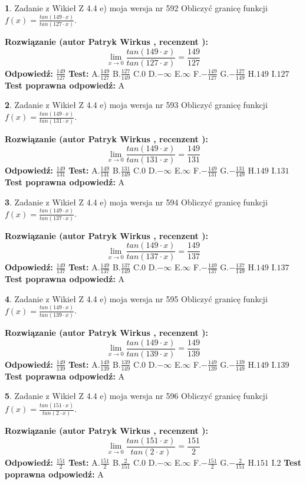 \documentclass[12pt, a4paper]{article}
\theoremstyle{definition} %
\newtheorem{zad}{}
\newcommand{\zadStart}[1]{\begin{zad}#1\newline}
\newcommand{\zadStop}{\end{zad}}
\newcommand{\rozwStart}[2]{\noindent \textbf{Rozwiązanie (autor #1 , recenzent #2): }\newline}
\newcommand{\rozwStop}{\newline}
\newcommand{\odpStart}{\noindent \textbf{Odpowiedź:}\newline}
\newcommand{\odpStop}{\newline}
\newcommand{\testStart}{\noindent \textbf{Test:}\newline}
\newcommand{\testStop}{\newline}
\newcommand{\kluczStart}{\noindent \textbf{Test poprawna odpowiedź:}\newline}
\newcommand{\kluczStop}{\newline}
\begin{document}
\zadStart{Zadanie z Wikieł Z 4.4 e) moja wersja nr 592}
Obliczyć granicę funkcji $f(x)=\frac{tan(149\cdot x)}{tan(127\cdot x)}$.
\zadStop
\rozwStart{Patryk Wirkus}{}
$$\lim\limits_{x\to 0}\frac{tan(149\cdot x)}{tan(127\cdot x)}=
\frac{149}{127}$$
\rozwStop
\odpStart
$\frac{149}{127}$
\odpStop
\testStart
A.$\frac{149}{127}$
B.$\frac{127}{149}$
C.$0$
D.$-\infty$
E.$\infty$
F.$-\frac{149}{127}$
G.$-\frac{127}{149}$
H.$149$
I.$127$
\testStop
\kluczStart
A
\kluczStop



\zadStart{Zadanie z Wikieł Z 4.4 e) moja wersja nr 593}
Obliczyć granicę funkcji $f(x)=\frac{tan(149\cdot x)}{tan(131\cdot x)}$.
\zadStop
\rozwStart{Patryk Wirkus}{}
$$\lim\limits_{x\to 0}\frac{tan(149\cdot x)}{tan(131\cdot x)}=
\frac{149}{131}$$
\rozwStop
\odpStart
$\frac{149}{131}$
\odpStop
\testStart
A.$\frac{149}{131}$
B.$\frac{131}{149}$
C.$0$
D.$-\infty$
E.$\infty$
F.$-\frac{149}{131}$
G.$-\frac{131}{149}$
H.$149$
I.$131$
\testStop
\kluczStart
A
\kluczStop



\zadStart{Zadanie z Wikieł Z 4.4 e) moja wersja nr 594}
Obliczyć granicę funkcji $f(x)=\frac{tan(149\cdot x)}{tan(137\cdot x)}$.
\zadStop
\rozwStart{Patryk Wirkus}{}
$$\lim\limits_{x\to 0}\frac{tan(149\cdot x)}{tan(137\cdot x)}=
\frac{149}{137}$$
\rozwStop
\odpStart
$\frac{149}{137}$
\odpStop
\testStart
A.$\frac{149}{137}$
B.$\frac{137}{149}$
C.$0$
D.$-\infty$
E.$\infty$
F.$-\frac{149}{137}$
G.$-\frac{137}{149}$
H.$149$
I.$137$
\testStop
\kluczStart
A
\kluczStop



\zadStart{Zadanie z Wikieł Z 4.4 e) moja wersja nr 595}
Obliczyć granicę funkcji $f(x)=\frac{tan(149\cdot x)}{tan(139\cdot x)}$.
\zadStop
\rozwStart{Patryk Wirkus}{}
$$\lim\limits_{x\to 0}\frac{tan(149\cdot x)}{tan(139\cdot x)}=
\frac{149}{139}$$
\rozwStop
\odpStart
$\frac{149}{139}$
\odpStop
\testStart
A.$\frac{149}{139}$
B.$\frac{139}{149}$
C.$0$
D.$-\infty$
E.$\infty$
F.$-\frac{149}{139}$
G.$-\frac{139}{149}$
H.$149$
I.$139$
\testStop
\kluczStart
A
\kluczStop



\zadStart{Zadanie z Wikieł Z 4.4 e) moja wersja nr 596}
Obliczyć granicę funkcji $f(x)=\frac{tan(151\cdot x)}{tan(2\cdot x)}$.
\zadStop
\rozwStart{Patryk Wirkus}{}
$$\lim\limits_{x\to 0}\frac{tan(151\cdot x)}{tan(2\cdot x)}=
\frac{151}{2}$$
\rozwStop
\odpStart
$\frac{151}{2}$
\odpStop
\testStart
A.$\frac{151}{2}$
B.$\frac{2}{151}$
C.$0$
D.$-\infty$
E.$\infty$
F.$-\frac{151}{2}$
G.$-\frac{2}{151}$
H.$151$
I.$2$
\testStop
\kluczStart
A
\kluczStop
\end{document}
